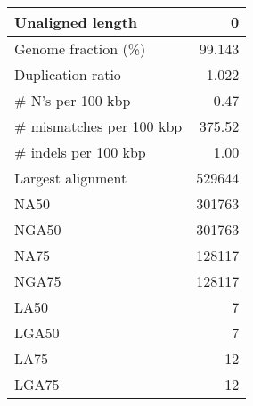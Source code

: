 \documentclass[12pt,a4paper]{article}
\begin{document}
\begin{table}[ht]
\begin{center}
\begin{tabular}{|l*{1}{|r}|}
Unaligned length & 0 \\ \hline
Genome fraction (\%) & 99.143 \\ \hline
Duplication ratio & 1.022 \\ \hline
\# N's per 100 kbp & 0.47 \\ \hline
\# mismatches per 100 kbp & 375.52 \\ \hline
\# indels per 100 kbp & 1.00 \\ \hline
Largest alignment & 529644 \\ \hline
NA50 & 301763 \\ \hline
NGA50 & 301763 \\ \hline
NA75 & 128117 \\ \hline
NGA75 & 128117 \\ \hline
LA50 & 7 \\ \hline
LGA50 & 7 \\ \hline
LA75 & 12 \\ \hline
LGA75 & 12 \\ \hline
\end{tabular}
\end{center}
\end{table}
\end{document}

